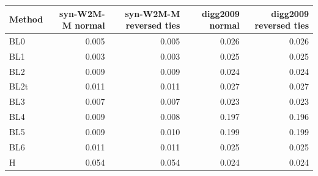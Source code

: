 \begin{tabular}{lrrrr}
\toprule
Method & syn-W2M-M normal & syn-W2M-M reversed ties & digg2009 normal & digg2009 reversed ties \\
\midrule
BL0 & 0.005 & 0.005 & 0.026 & 0.026 \\
BL1 & 0.003 & 0.003 & 0.025 & 0.025 \\
BL2 & 0.009 & 0.009 & 0.024 & 0.024 \\
BL2t & 0.011 & 0.011 & 0.027 & 0.027 \\
BL3 & 0.007 & 0.007 & 0.023 & 0.023 \\
BL4 & 0.009 & 0.008 & 0.197 & 0.196 \\
BL5 & 0.009 & 0.010 & 0.199 & 0.199 \\
BL6 & 0.011 & 0.011 & 0.025 & 0.025 \\
H & 0.054 & 0.054 & 0.024 & 0.024 \\
\bottomrule
\end{tabular}
